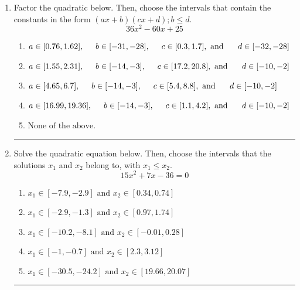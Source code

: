 \documentclass[14pt]{extbook}
\newcommand{\litem}[1]{\item#1\hspace*{-1cm}\rule{\textwidth}{0.4pt}}
\begin{document}
\begin{enumerate}
{\begin{enumerate}[label=\Alph*.]
\end{enumerate} }
\litem{
Factor the quadratic below. Then, choose the intervals that contain the constants in the form $(ax+b)(cx+d); b \leq d.$\[ 36x^{2} -60 x + 25 \]\begin{enumerate}[label=\Alph*.]
\item \( a \in [0.76, 1.62], \hspace*{5mm} b \in [-31, -28], \hspace*{5mm} c \in [0.3, 1.7], \text{ and } \hspace*{5mm} d \in [-32, -28] \)
\item \( a \in [1.55, 2.31], \hspace*{5mm} b \in [-14, -3], \hspace*{5mm} c \in [17.2, 20.8], \text{ and } \hspace*{5mm} d \in [-10, -2] \)
\item \( a \in [4.65, 6.7], \hspace*{5mm} b \in [-14, -3], \hspace*{5mm} c \in [5.4, 8.8], \text{ and } \hspace*{5mm} d \in [-10, -2] \)
\item \( a \in [16.99, 19.36], \hspace*{5mm} b \in [-14, -3], \hspace*{5mm} c \in [1.1, 4.2], \text{ and } \hspace*{5mm} d \in [-10, -2] \)
\item \( \text{None of the above.} \)

\end{enumerate} }
\litem{
Solve the quadratic equation below. Then, choose the intervals that the solutions $x_1$ and $x_2$ belong to, with $x_1 \leq x_2$.\[ 15x^{2} +7 x -36 = 0 \]\begin{enumerate}[label=\Alph*.]
\item \( x_1 \in [-7.9, -2.9] \text{ and } x_2 \in [0.34, 0.74] \)
\item \( x_1 \in [-2.9, -1.3] \text{ and } x_2 \in [0.97, 1.74] \)
\item \( x_1 \in [-10.2, -8.1] \text{ and } x_2 \in [-0.01, 0.28] \)
\item \( x_1 \in [-1, -0.7] \text{ and } x_2 \in [2.3, 3.12] \)
\item \( x_1 \in [-30.5, -24.2] \text{ and } x_2 \in [19.66, 20.07] \)


\end{enumerate}}
\end{enumerate}
\end{document}
